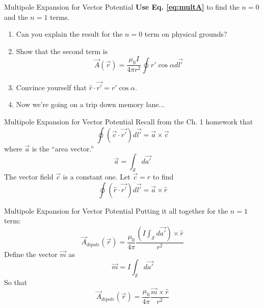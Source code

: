\documentclass{beamer}
\begin{document}
\begin{frame}{Multipole Expansion for Vector Potential}
\alert{\textbf{Use Eq. \ref{eq:multA}}} to find the $n = 0$ and the $n = 1$ terms.
\begin{enumerate}
\item Can you explain the result for the $n = 0$ term on physical grounds?
\item Show that the second term is
\begin{equation}
\vec{A}(\vec{r}) = \frac{\mu_0 I}{4\pi r^2} \oint r' \cos\alpha d\vec{l'}
\end{equation}
\item Convince yourself that $\hat{r} \cdot \vec{r'} = r' \cos\alpha$.
\item Now we're going on a trip down memory lane...
\end{enumerate}
\end{frame}

\begin{frame}{Multipole Expansion for Vector Potential}
Recall from the Ch. 1 homework that
\begin{equation}
\oint (\vec{c} \cdot \vec{r'}) d\vec{l'} = \vec{a} \times \vec{c}
\end{equation}
where $\vec{a}$ is the ``area vector.''
\begin{equation}
\vec{a} = \int_{\mathcal{S}} d\vec{a'}
\end{equation}
The vector field $\vec{c}$ is a constant one.  Let $\vec{c} = \hat{r}$ to find
\begin{equation}
\oint (\hat{r} \cdot \vec{r'}) d\vec{l'} = \vec{a} \times \hat{r}
\end{equation}
\end{frame}

\begin{frame}{Multipole Expansion for Vector Potential}
Putting it all together for the $n = 1$ term:
\begin{equation}
\vec{A}_{dipole}(\vec{r}) = \frac{\mu_0}{4\pi} \frac{\left(I \int_{\mathcal{S}} d\vec{a'}\right) \times \hat{r}}{r^2}
\end{equation}
Define the vector $\vec{m}$ as
\begin{equation}
\vec{m} = I \int_{\mathcal{S}} d\vec{a'}
\end{equation}
So that
\begin{equation}
\boxed{
\vec{A}_{dipole}(\vec{r}) = \frac{\mu_0}{4\pi} \frac{\vec{m} \times \hat{r}}{r^2}
}
\end{equation}
\end{frame}
\end{document}
